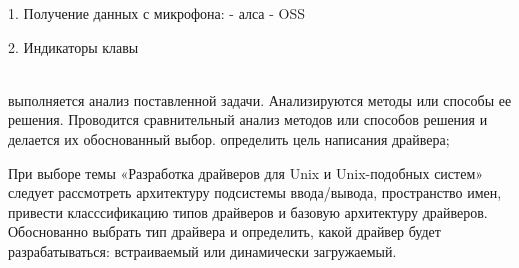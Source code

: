 1. Получение данных с микрофона: 
- алса
- OSS

2. Индикаторы клавы

\HRule \\
выполняется анализ поставленной задачи. Анализируются методы или способы ее решения. Проводится сравнительный анализ методов или способов решения и делается их обоснованный выбор. 
определить цель написания драйвера;

При выборе темы «Разработка драйверов для Unix и Unix-подобных систем» следует рассмотреть архитектуру подсистемы ввода/вывода, пространство имен, привести класссификацию типов драйверов и базовую архитектуру драйверов. Обоснованно выбрать тип драйвера  и определить, какой драйвер будет разрабатываться: встраиваемый или динамически загружаемый.